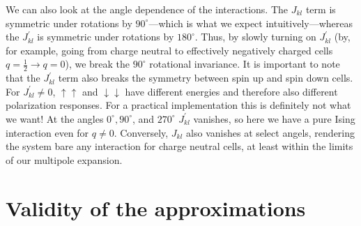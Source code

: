 We can also look at the angle dependence of the interactions. The $J_{kl}$ term is
symmetric under rotations by $90^{\circ}$---which is what we expect
intuitively---whereas the $J^{\prime}_{kl}$ is symmetric under rotations by
$180^{\circ}$. Thus, by slowly turning on $J^{\prime}_{kl}$ (by, for example, going
from charge neutral to effectively negatively charged cells $q = \frac{1}{2}
\rightarrow q = 0$), we break the $90^{\circ}$ rotational invariance. It is
important to note that the $J^{\prime}_{kl}$ term also breaks the symmetry between
spin up and spin down cells. For $J^{\prime}_{kl} \ne 0$, $\uparrow\uparrow$ and
$\downarrow\downarrow$ have different energies and therefore also different
polarization responses. For a practical implementation this is definitely not
what we want! At the angles $0^{\circ}, 90^{\circ}$, and $270^{\circ}$
$J^{\prime}_{kl}$ vanishes, so here we have a pure Ising interaction even for $q
\ne 0$. Conversely, $J_{kl}$ also vanishes at select angels, rendering the system
bare any interaction for charge neutral cells, at least within the limits of our
multipole expansion.



\section{Validity of the approximations}



